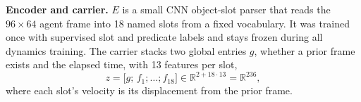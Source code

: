 \textbf{Encoder and carrier.} $E$ is a small CNN object-slot parser that reads the $96\times64$ agent frame into 18 named slots from a fixed vocabulary. It was trained once with supervised slot and predicate labels and stays frozen during all dynamics training. The carrier stacks two global entries $g$, whether a prior frame exists and the elapsed time, with 13 features per slot,
\begin{equation}
z=\big[g;\,f_1;\dots;f_{18}\big]\in\mathbb{R}^{2+18\cdot13}=\mathbb{R}^{236},
\label{eq:carrier}
\end{equation}
where each slot's velocity is its displacement from the prior frame.

